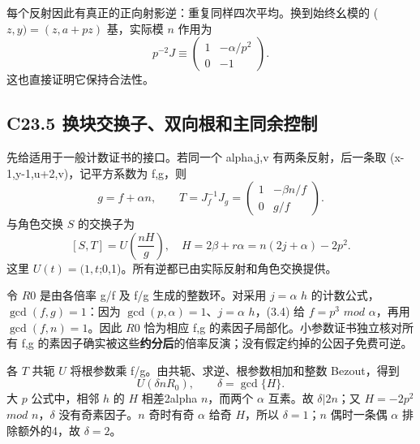 {每个反射因此有真正的正向射影逆：重复同样四次平均。换到始终幺模的} {(\ensuremath{z,y)=(z,a+pz)}} {基，实际模} {\ensuremath{n}} {作用为} \[
p^{-2}J\equiv
\begin{pmatrix}1&-\alpha/p^2\\0&-1\end{pmatrix}.
\tag{C23.3.5}
\] {这也直接证明它保持合法性。}

\subsection*{\texorpdfstring{{C23.5} {换块交换子、双向根和主同余控制}}{C23.5 换块交换子、双向根和主同余控制}}\label{C23-h153}

{先给适用于一般计数证书的接口。若同一个} {alpha,j,v} {有两条反射，后一条取} {(x-1,y-1,u+2,v)，记平方系数为} {f,g，则} \[
g=f+\alpha n,\qquad
T=J_f^{-1}J_g=
\begin{pmatrix}1&-\beta n/f\\0&g/f\end{pmatrix}.
\tag{C23.5.1}
\] {与角色交换} {\ensuremath{S}} {的交换子为} \[
\boxed{[S,T]=U\!\left(\frac{nH}{g}\right),\quad
H=2\beta+r\alpha=n(2j+\alpha)-2p^2.}
\tag{C23.5.2}
\] {这里} {\ensuremath{U(t)=(1,t};0,1)。所有逆都已由实际反射和角色交换提供。}

{令} {\ensuremath{R0}} {是由各倍率} {g/f} {及} {f/g} {生成的整数环。对采用} {\ensuremath{j=\alpha }} {\ensuremath{h}} {的计数公式，\ensuremath{\operatorname{gcd}(f,g)=1}：因为} {\ensuremath{\operatorname{gcd}(p,\alpha )=1}、\ensuremath{j=\alpha }} {\ensuremath{h}，(3.4)} {给} {\ensuremath{f=p^{3}}} {\ensuremath{mod}} {\ensuremath{\alpha }，再用} {\ensuremath{\operatorname{gcd}(f,n)=1}。因此} {\ensuremath{R0}} {恰为相应} {f,g} {的素因子局部化。小参数证书独立核对所有} {f,g} {的素因子确实被这些}\textbf{{约分后}}{的倍率反演；没有假定约掉的公因子免费可逆。}

{各} {\ensuremath{T}} {共轭} {\ensuremath{U}} {将根参数乘} {f/g。由共轭、求逆、根参数相加和整数} {Bezout，得到} \[
U(\delta nR_0),\qquad\delta=\gcd\{H\}.
\tag{C23.5.3}
\] {大} {\ensuremath{p}} {公式中，相邻} {\ensuremath{h}} {的} {\ensuremath{H}} {相差2alpha} {\ensuremath{n}，而两个} {\ensuremath{\alpha }} {互素。故} {\ensuremath{\delta |2n}；又} {\ensuremath{H=-2p^{2}}} {\ensuremath{mod}} {\ensuremath{n}，\ensuremath{\delta }} {没有奇素因子。\ensuremath{n}} {奇时有奇} {\ensuremath{\alpha }} {给奇} {\ensuremath{H}，所以} {\ensuremath{\delta =1}；\ensuremath{n}} {偶时一条偶} {\ensuremath{\alpha }} {排除额外的4，故} {\ensuremath{\delta =2}。}

